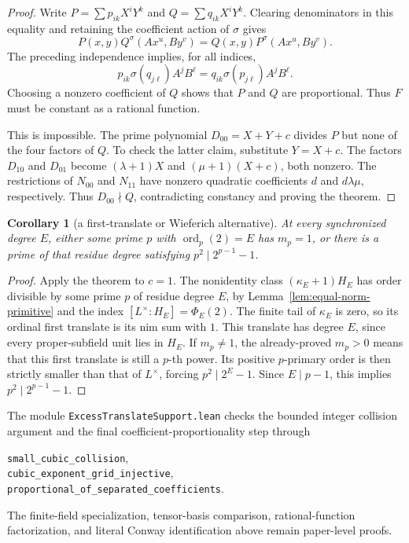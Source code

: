 \documentclass[11pt]{article}
\newtheorem{corollary}[theorem]{Corollary}
\theoremstyle{definition}
\theoremstyle{remark}
\begin{document}
\begin{proof}
Write $P=\sum p_{ik}X^iY^k$ and $Q=\sum q_{ik}X^iY^k$.
Clearing denominators in this equality and retaining
the coefficient action of $\sigma$ gives
\[
 P(x,y)Q^\sigma(Ax^u,By^v)
   =Q(x,y)P^\sigma(Ax^u,By^v).
\]
The preceding independence implies, for all indices,
\[
 p_{ik}\sigma(q_{j\ell})A^jB^\ell
   =q_{ik}\sigma(p_{j\ell})A^jB^\ell.
\]
Choosing a nonzero coefficient of $Q$ shows that $P$ and $Q$ are
proportional.  Thus $F$ must be constant as a rational function.

This is impossible.  The prime polynomial $D_{00}=X+Y+c$ divides $P$
but none of the four factors of $Q$.  To check the latter claim, substitute
$Y=X+c$.  The factors $D_{10}$ and $D_{01}$ become
$(\lambda+1)X$ and $(\mu+1)(X+c)$, both nonzero.  The restrictions of
$N_{00}$ and $N_{11}$ have nonzero quadratic coefficients $d$ and
$d\lambda\mu$, respectively.  Thus $D_{00}\nmid Q$, contradicting
constancy and proving the theorem.
\end{proof}

\begin{corollary}[a first-translate or Wieferich alternative]
\label{cor:equal-norm-first-translate}
At every synchronized degree $E$, either some prime $p$ with
$\operatorname{ord}_p(2)=E$ has $m_p=1$, or there is a prime of that
residue degree satisfying $p^2\mid2^{p-1}-1$.
\end{corollary}

\begin{proof}
Apply the theorem to $c=1$.  The nonidentity class
$(\kappa_E+1)H_E$ has order divisible by some prime $p$ of residue
degree $E$, by Lemma~\ref{lem:equal-norm-primitive} and the index
$[L^\times:H_E]=\Phi_E(2)$.  The finite tail of $\kappa_E$ is zero,
so its ordinal first translate is its nim sum with $1$.
This translate has degree $E$, since every proper-subfield unit lies in
$H_E$.
If $m_p\ne1$, the already-proved $m_p>0$ means that this first translate
is still a $p$-th power.  Its positive $p$-primary order is then strictly
smaller than that of $L^\times$, forcing $p^2\mid2^E-1$.
Since $E\mid p-1$, this implies $p^2\mid2^{p-1}-1$.
\end{proof}

The module \texttt{ExcessTranslateSupport.lean} checks the bounded integer
collision argument and the final coefficient-proportionality step through
\begin{center}
\texttt{small\_cubic\_collision},\\
\texttt{cubic\_exponent\_grid\_injective},\\
\texttt{proportional\_of\_separated\_coefficients}.
\end{center}
The finite-field
specialization, tensor-basis comparison, rational-function factorization,
and literal Conway identification above remain paper-level proofs.
\end{document}
